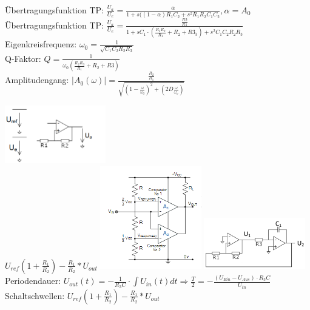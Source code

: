 \documentclass[A4]{scrartcl}
\begin{document}
  Übertragungsfunktion TP: $\frac{U_a}{U_e} = \frac{\alpha}{1+s((1-\alpha)R_1C_2+s^2R_1R_2C_1C_2}, \alpha = A_0$\\
  
  Übertragungsfunktion TP: $\frac{U_a}{U_e} = \frac{\frac{R2}{R1}}{1+sC_1\cdot (\frac{R_3 R_2}{R_1} + R_2 + R3_3) + s^2C_1C_2R_2R_3 }$\\
  Eigenkreisfrequenz: $\omega_0 = \frac{1}{\sqrt{C_1C_2R_2R_3}}$\\
  Q-Faktor: $Q = \frac{1}{\omega_0 (\frac{R_2R_3}{R_1}+R_2+R3)}$\\
  Amplitudengang: $|A_0(\omega)| = \frac{\frac{R_2}{R_1}}{\sqrt{(1-\frac{\omega}{\omega_0})^2+(2D\frac{\omega}{\omega_o})}}$

  \includegraphics[width=0.33\textwidth]{Komparator.png}\\
  $U_{ref}(1+\frac{R_1}{R_2})-\frac{R_1}{R_2}*U_{out}$
  \includegraphics[width=0.33\textwidth]{Fensterkomparator.png}
  \includegraphics[width=0.33\textwidth]{Rechteck_Dreieck_Generator.png}\\
  Periodendauer: $U_{out}(t) = -\frac{1}{R_3C}\cdot\int U_{in}(t)dt \Rightarrow \frac{T}{2} = -\frac{(U_{Ein}-U_{Aus})\cdot R_3C}{U_{in}}$\\ %
  Schaltschwellen: $U_{ref}(1+\frac{R_1}{R_2})-\frac{R_1}{R_2}*U_{out}$\\
\end{document}
